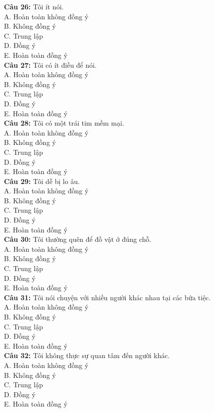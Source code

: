 \begin{multicols}{2}
\textbf{Câu 26:} Tôi ít nói. \\
A. Hoàn toàn không đồng ý \\
B. Không đồng ý \\
C. Trung lập \\
D. Đồng ý \\
E. Hoàn toàn đồng ý \\

\textbf{Câu 27:} Tôi có ít điều để nói. \\
A. Hoàn toàn không đồng ý \\
B. Không đồng ý \\
C. Trung lập \\
D. Đồng ý \\
E. Hoàn toàn đồng ý \\

\textbf{Câu 28:} Tôi có một trái tim mềm mại. \\
A. Hoàn toàn không đồng ý \\
B. Không đồng ý \\
C. Trung lập \\
D. Đồng ý \\
E. Hoàn toàn đồng ý \\

\textbf{Câu 29:} Tôi dễ bị lo âu. \\
A. Hoàn toàn không đồng ý \\
B. Không đồng ý \\
C. Trung lập \\
D. Đồng ý \\
E. Hoàn toàn đồng ý \\

\textbf{Câu 30:} Tôi thường quên để đồ vật ở đúng chỗ. \\
A. Hoàn toàn không đồng ý \\
B. Không đồng ý \\
C. Trung lập \\
D. Đồng ý \\
E. Hoàn toàn đồng ý \\

\textbf{Câu 31:} Tôi nói chuyện với nhiều người khác nhau tại các bữa tiệc. \\
A. Hoàn toàn không đồng ý \\
B. Không đồng ý \\
C. Trung lập \\
D. Đồng ý \\
E. Hoàn toàn đồng ý \\

\textbf{Câu 32:} Tôi không thực sự quan tâm đến người khác. \\
A. Hoàn toàn không đồng ý \\
B. Không đồng ý \\
C. Trung lập \\
D. Đồng ý \\
E. Hoàn toàn đồng ý \\


\end{multicols}
